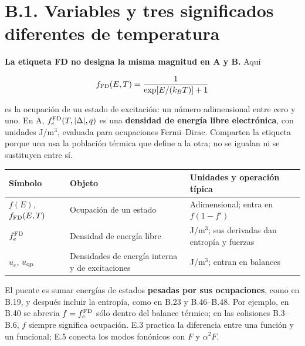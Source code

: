 \documentclass[
  spanish,
  10pt,
  a4paper,
]{article}
\newcounter{none} %
\begin{document}
\section{B.1. Variables y tres significados diferentes de
temperatura}\label{b.1.-variables-y-tres-significados-diferentes-de-temperatura}

\textbf{La etiqueta FD no designa la misma magnitud en A y B.} Aquí

\[
f_{\rm FD}(E,T)=\frac{1}{\exp[E/(k_BT)]+1}
\]

es la ocupación de un estado de excitación: un número adimensional entre
cero y uno. En A, \(f_e^{\rm FD}(T,|\Delta|,q)\) es una \textbf{densidad
de energía libre electrónica}, con unidades J/m\(^3\), evaluada para
ocupaciones Fermi--Dirac. Comparten la etiqueta porque una usa la
población térmica que define a la otra; no se igualan ni se sustituyen
entre sí.

{\def\LTcaptype{none} %
\begin{longtable}[]{@{}
  >{\raggedright\arraybackslash}p{}
  >{\raggedright\arraybackslash}p{}
  >{\raggedright\arraybackslash}p{}@{}}
\toprule\noalign{}
\begin{minipage}[b]{\linewidth}\raggedright
Símbolo
\end{minipage} & \begin{minipage}[b]{\linewidth}\raggedright
Objeto
\end{minipage} & \begin{minipage}[b]{\linewidth}\raggedright
Unidades y operación típica
\end{minipage} \\
\midrule\noalign{}
\endhead
\bottomrule\noalign{}
\endlastfoot
\(f(E)\), \(f_{\rm FD}(E,T)\) & Ocupación de un estado & Adimensional;
entra en \(f(1-f')\) \\
\(f_e^{\rm FD}\) & Densidad de energía libre & J/m\(^3\); sus derivadas
dan entropía y fuerzas \\
\(u_e\), \(u_{\rm qp}\) & Densidades de energía interna y de
excitaciones & J/m\(^3\); entran en balances \\
\end{longtable}
}

El puente es sumar energías de estados \textbf{pesadas por sus
ocupaciones}, como en B.19, y después incluir la entropía, como en B.23
y B.46--B.48. Por ejemplo, en B.40 se abrevia \(f=f_e^{\rm FD}\) sólo
dentro del balance térmico; en las colisiones B.3--B.6, \(f\) siempre
significa ocupación. E.3 practica la diferencia entre una función y un
funcional; E.5 conecta los modos fonónicos con \(F\) y \(\alpha^2F\).
\end{document}
